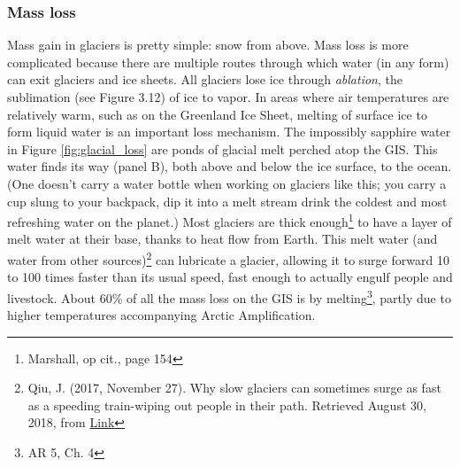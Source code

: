 \subsubsection{Mass loss} Mass gain in glaciers is pretty simple: snow from above. Mass loss is more complicated because there are multiple routes through which water (in any form) can exit glaciers and ice sheets. All glaciers lose ice through \emph{ablation}, the sublimation (see Figure 3.12) of ice to vapor. In areas where air temperatures are relatively warm, such as on the Greenland Ice Sheet, melting of surface ice to form liquid water is an important loss mechanism. The impossibly sapphire water in Figure \ref{fig:glacial_loss} are ponds of glacial melt perched atop the GIS. This water finds its way (panel B), both above and below the ice surface, to the ocean. (One doesn't carry a water bottle when working on glaciers like this; you carry a cup slung to your backpack, dip it into a melt stream drink the coldest and most refreshing water on the planet.) Most glaciers are thick enough\footnote{Marshall, op cit., page 154} to have a layer of melt water at their base, thanks to heat flow from Earth. This melt water (and water from other sources)\footnote{Qiu, J. (2017, November 27). Why slow glaciers can sometimes surge as fast as a speeding train-wiping out people in their path. Retrieved August 30, 2018, from \href{http://www.sciencemag.org/news/2017/11/why-slow-glaciers-can-sometimes-surge-fast-speeding-train-wiping-out-people-their-path}{Link}} can lubricate a glacier, allowing it to surge forward 10 to 100 times faster than its usual speed, fast enough to actually engulf people and livestock. About 60\% of all the mass loss on the GIS is by melting\footnote{AR 5, Ch. 4}, partly due to higher temperatures accompanying Arctic Amplification.\\

